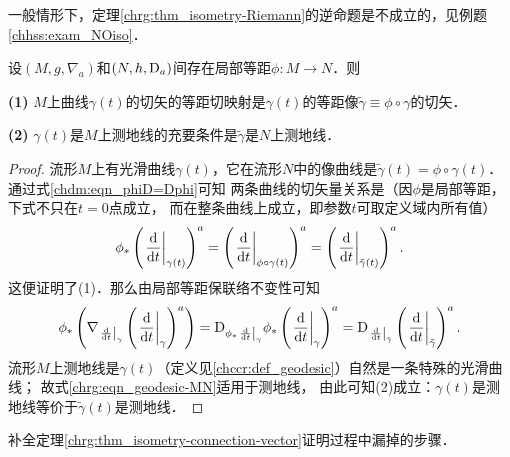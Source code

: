 一般情形下，定理\ref{chrg:thm_isometry-Riemann}的逆命题是不成立的，见例题\ref{chhss:exam_NOiso}．

\begin{theorem}\label{chrg:thm_geodesic-MN}
    设$(M,g,\nabla_a)$和$(N,h,{\rm D}_a)$间存在局部等距$\phi:M\to N$．则

    {\bfseries (1)} $M$上曲线$\gamma(t)$的切矢的等距切映射是$\gamma(t)$的等距像$\tilde{\gamma}\equiv\phi\circ \gamma$的切矢．

    {\bfseries (2)} $\gamma(t)$是$M$上测地线的充要条件是$\tilde{\gamma}$是$N$上测地线．
\end{theorem}
\begin{proof}
    流形$M$上有光滑曲线$\gamma(t)$，它在流形$N$中的像曲线是$\tilde{\gamma}(t)=\phi\circ\gamma(t)$．
    通过式\eqref{chdm:eqn_phiD=Dphi}可知
    两条曲线的切矢量关系是（因$\phi$是局部等距，下式不只在$t=0$点成立，
    而在整条曲线上成立，即参数$t$可取定义域内所有值）
    \begin{equation}\label{chrg:eqn_dgM-gdN}
        \phi_{*}\left(\left.\frac{{\rm d}  }{{\rm d} t}\right|_{\gamma(t)}\right)^a
        = \left(\left.\frac{{\rm d}  }{{\rm d} t}\right|_{\phi\circ\gamma(t)}\right)^a
        = \left(\left.\frac{{\rm d}  }{{\rm d} t}\right|_{\tilde{\gamma}(t)}\right)^a.
    \end{equation}
    这便证明了(1)．那么由局部等距保联络不变性可知
    \begin{equation}\label{chrg:eqn_geodesic-MN}
       \phi_{*}\left( \nabla_{\left.\frac{{\rm d}  }{{\rm d} t}\right|_{\gamma}}
         \left(\left.\frac{{\rm d}  }{{\rm d} t}\right|_{\gamma}\right)^a \right)
       ={\rm D}_{\phi_{*}\left.\frac{{\rm d}  }{{\rm d} t}\right|_{\gamma}}
         \phi_{*}\left(\left.\frac{{\rm d}  }{{\rm d} t}\right|_{\gamma}\right)^a
       ={\rm D}_{\left.\frac{{\rm d}  }{{\rm d} t}\right|_{\tilde{\gamma}}}
       \left(\left.\frac{{\rm d}  }{{\rm d} t}\right|_{\tilde{\gamma}}\right)^a .
    \end{equation} %
    流形$M$上测地线是$\gamma(t)$（定义见\ref{chccr:def_geodesic}）自然是一条特殊的光滑曲线；
    故式\eqref{chrg:eqn_geodesic-MN}适用于测地线，
    由此可知(2)成立：$\gamma(t)$是测地线等价于$\tilde{\gamma}(t)$是测地线．
\end{proof}


\begin{exercise}
	补全定理\ref{chrg:thm_isometry-connection-vector}证明过程中漏掉的步骤．
\end{exercise}

